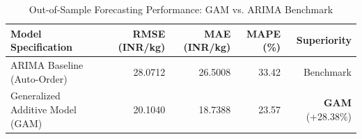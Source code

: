 \begin{table}[htbp]
\centering
\caption{Out-of-Sample Forecasting Performance: GAM vs. ARIMA Benchmark}
\label{tab:model_comparison}
\begin{tabular}{lrrrr}
\toprule
Model Specification & RMSE (INR/kg) & MAE (INR/kg) & MAPE (\%) & Superiority \\
\midrule
ARIMA Baseline (Auto-Order) & 28.0712 & 26.5008 & 33.42 & Benchmark \\
Generalized Additive Model (GAM) & 20.1040 & 18.7388 & 23.57 & \textbf{GAM} (+28.38\%) \\
\bottomrule
\end{tabular}
\end{table}